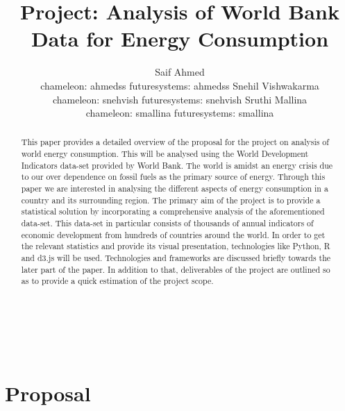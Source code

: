 \documentclass{sig-alternate-05-2015}
\begin{document}
\title{Project: Analysis of World Bank Data for Energy Consumption 
}
\author{
\alignauthor
Saif Ahmed \\
       chameleon: ahmedss
       futuresystems: ahmedss
\alignauthor
Snehil Vishwakarma\\
       chameleon: snehvish
       futuresystems: snehvish
\alignauthor
Sruthi Mallina\\
       chameleon: smallina
       futuresystems: smallina
}
\maketitle
\begin{abstract}
This paper provides a detailed overview of the proposal for the project on analysis of world energy consumption. This will be analysed using the World Development Indicators data-set provided by World Bank. The world is amidst an energy crisis due to our over dependence on fossil fuels as the primary source of energy. Through this paper we are interested in analysing the different aspects of energy consumption in a country and its surrounding region. The primary aim of the project is to provide a statistical solution by incorporating a comprehensive analysis of the aforementioned data-set. This data-set in particular consists of thousands of annual indicators of economic development from hundreds of countries around the world. In order to get the relevant statistics and provide its visual presentation, technologies like Python, R and d3.js will be used. Technologies and frameworks are discussed briefly towards the later part of the paper. In addition to that, deliverables of the project are outlined so as to provide a quick estimation of the project scope.
\end{abstract}
\\

\\

\section{Proposal}
\end{document}
